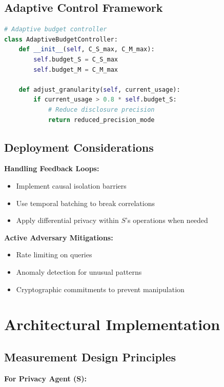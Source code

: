 \documentclass[11pt,a4paper]{article}
\theoremstyle{definition}
\begin{document}
\subsection{Adaptive Control Framework}

\begin{lstlisting}[language=Python, caption=Adaptive budget controller]
# Adaptive budget controller
class AdaptiveBudgetController:
    def __init__(self, C_S_max, C_M_max):
        self.budget_S = C_S_max
        self.budget_M = C_M_max
        
    def adjust_granularity(self, current_usage):
        if current_usage > 0.8 * self.budget_S:
            # Reduce disclosure precision
            return reduced_precision_mode
\end{lstlisting}

\subsection{Deployment Considerations}

\textbf{Handling Feedback Loops:}

\begin{itemize}
    \item Implement causal isolation barriers
    \item Use temporal batching to break correlations
    \item Apply differential privacy within $S$'s operations when needed
\end{itemize}

\textbf{Active Adversary Mitigations:}

\begin{itemize}
    \item Rate limiting on queries
    \item Anomaly detection for unusual patterns
    \item Cryptographic commitments to prevent manipulation
\end{itemize}

\section{Architectural Implementation}

\subsection{Measurement Design Principles}

\textbf{For Privacy Agent (S):}
\end{document}
